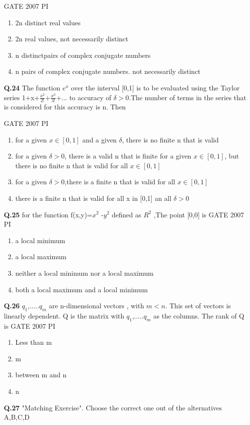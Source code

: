 \documentclass[journal,12pt,onecolumn]{exam}
\theoremstyle{remark}
\begin{document}
            \hfill{GATE 2007 PI}
            \begin{enumerate}
                \item 2n distinct real values 
                \item 	2n real values, not necessarily distinct
                \item 	n distinctpairs of complex conjugate numbers
                \item n pairs of complex conjugate numbers. not necessarily distinct
            \end{enumerate}
            \noindent
           \textbf{Q.24}
            The function $e^{x}$ over the interval [0,1] is to be evaluated using the Taylor series 1+x+$\frac{x^{2}}{2!}$+$\frac{x^{3}}{3!}$+... to accuracy of $\delta>0$.The number of terms in the series that is considered for this accuracy is n. Then


            \hfill{GATE 2007 PI}
            \begin{enumerate}
                \item for a given $x \in [0,1]$ and a given $\delta$, there is no finite n that is valid
                 \item for a given $\delta > 0$, there is a valid n that is finite for a given $x \in[0,1] $, but there is no finite n that is valid for all $x \in[0,1]$
                 \item for a given $\delta >0$,there is a finite n that is valid for all $x \in [0,1]$
                 \item there is a finite n that is valid for all x in [0,1] an all $\delta >0$
                 \end{enumerate}
            \noindent
            \textbf{Q.25}
                 for the function f(x,y)=$x^{2}$ -$y^{2}$ defined as $R^{2}$ ,The point [0,0] is
                 \hfill{GATE 2007 PI}
                 \begin{enumerate}
                \item a local minimum
                \item a local maximum
                \item neither a local minimum nor a local    maximum
                \item both a local maximum and a local minimum
                 \end{enumerate}
\noindent
\textbf{Q.26}
$q_{1}$,.....$q_{m}$ are n-dimensional vectors , with $m < n$. This set of vectors is linearly dependent. Q is the matrix with $q_{1}$,.....$q_{m}$ as the columns. The rank of Q is
\hfill{GATE 2007 PI}
\begin{enumerate}
    \item Less than m
    \item m
    \item between m and n
    \item n
    \end{enumerate}
    \noindent
    \textbf{Q.27}
    "Matching Exercise". Choose the correct one out of the alternatives A,B,C,D
   
\end{document}
